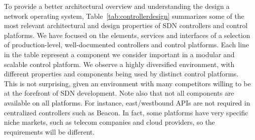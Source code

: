 To provide a better architectural overview and understanding the design a network operating system, Table~\ref{tab:controllerdesign} summarizes some of the most relevant architectural and design properties of 
SDN controllers and control platforms. 
We have focused on the elements, services and interfaces of a selection of production-level, well-documented controllers and control platforms.
Each line in the table represent a component we consider important in a modular and scalable control platform.
We observe a highly diversified environment, with different properties and components being used by distinct control platforms.
This is not surprising, given an environment with many competitors willing to be at the forefront of SDN development.
Note also that not all components are available on all platforms.
For instance, east/westbound APIs are not required in centralized controllers such as Beacon. 
In fact, some platforms have very specific niche markets, such as telecom companies and cloud providers, so the requirements will be different.


